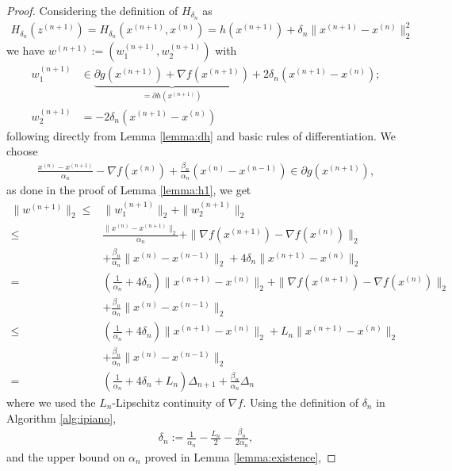 \documentclass[onecolumn,final,a4paper,13pt,reqno]{siamart}
\begin{document}
\begin{proof}
	Considering the definition of $H_{\delta_n}$ as
	\begin{align}
		H_{\delta_n} (z^{(n + 1)}) = H_{\delta_n} (x^{(n + 1)}, x^{(n)}) = h(x^{(n + 1)}) + \delta_n\|x^{(n + 1)} - x^{(n)}\|_2^2
	\end{align}
	we have $w^{(n + 1)} := (w^{(n + 1)}_1, w^{(n + 1)}_2)$ with
	\begin{align}
		w^{(n + 1)}_1 &\in \underbrace{\partial g(x^{(n + 1)}) + \nabla f(x^{(n + 1)})}_{= \partial h(x^{(n + 1)})} + 2\delta_n (x^{(n + 1)} - x^{(n)});\\
		w^{(n + 1)}_2 &= -2\delta_n(x^{(n + 1)} - x^{(n)})
	\end{align}
	following directly from Lemma \ref{lemma:dh} and basic rules of differentiation. We choose
	\begin{align}
		\frac{x^{(n)} - x^{(n + 1)}}{\alpha_n} - \nabla f(x^{(n)}) + \frac{\beta_n}{\alpha_n}(x^{(n)} - x^{(n - 1)}) \in \partial g(x^{(n + 1)}),
	\end{align}
	as done in the proof of Lemma \ref{lemma:h1}, we get
	\begin{align}
		\|w^{(n + 1)}\|_2 \leq &\|w^{(n + 1)}_1\|_2 + \|w^{(n + 1)}_2\|_2\\
		\leq &\frac{\|x^{(n)} - x^{(n + 1)}\|_2}{\alpha_n} + \|\nabla f(x^{(n + 1)}) - \nabla f(x^{(n)})\|_2\\
		&+\frac{\beta_n}{\alpha_n} \|x^{(n)} - x^{(n - 1)}\|_2 + 4\delta_n\|x^{(n + 1)} - x^{(n)}\|_2\\
		=& \left(\frac{1}{\alpha_n} + 4\delta_n\right) \|x^{(n + 1)} - x^{(n)}\|_2 + \|\nabla f(x^{(n + 1)}) - \nabla f(x^{(n)})\|_2\\
		&+ \frac{\beta_n}{\alpha_n}\|x^{(n)} - x^{(n - 1)}\|_2\\
		\leq& \left(\frac{1}{\alpha_n} + 4\delta_n\right) \|x^{(n + 1)} - x^{(n)}\|_2 + L_n \|x^{(n + 1)} - x^{(n)}\|_2\\
		&+ \frac{\beta_n}{\alpha_n}\|x^{(n)} - x^{(n - 1)}\|_2\\
		=&\left(\frac{1}{\alpha_n} + 4\delta_n + L_n\right)\Delta_{n + 1} + \frac{\beta_n}{\alpha_n}\Delta_n
	\end{align}
	where we used the $L_n$-Lipschitz continuity of $\nabla f$. Using the definition of $\delta_n$ in Algorithm \ref{alg:ipiano},
	\begin{align}
		\delta_n := \frac{1}{\alpha_n} - \frac{L_n}{2} - \frac{\beta_n}{2\alpha_n},
	\end{align}
	and the upper bound on $\alpha_n$ proved in Lemma \ref{lemma:existence},

\end{proof}
\end{document}
